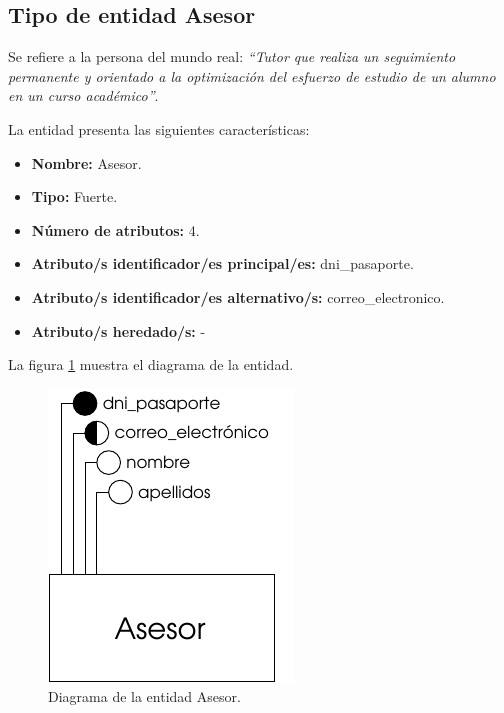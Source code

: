 \subsection{Tipo de entidad Asesor}

   \begin{description}

   \item[Definición] Se refiere a la persona del mundo real: \emph{``Tutor que
        realiza un seguimiento permanente y orientado a la optimización del
        esfuerzo de estudio de un alumno en un curso académico''}.

   \item[Características] La entidad presenta las siguientes características:
      \begin{itemize}
         \item \textbf{Nombre:} Asesor.
         \item \textbf{Tipo:} Fuerte.
         \item \textbf{Número de atributos:} 4.
         \item \textbf{Atributo/s identificador/es principal/es:} dni\_pasaporte.
         \item \textbf{Atributo/s identificador/es alternativo/s:} correo\_electronico.
         \item \textbf{Atributo/s heredado/s:} -
      \end{itemize}

   \item[Diagrama] La figura \ref{diagramaAsesor} muestra el diagrama de la entidad.
   \item \begin{figure}[!ht]
            \begin{center}
            \includegraphics[]{07.Modelo_Entidad-Interrelacion/7.2.Analisis_Entidades/diagramas/asesor.pdf}
            \caption{Diagrama de la entidad Asesor.}
            \label{diagramaAsesor}
            \end{center}
         \end{figure}


\end{description}
